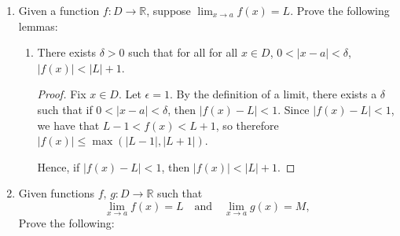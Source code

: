 \documentclass[12pt]{amsart}
\begin{document}
\begin{enumerate}
\begin{proof}
Case 2: $x > 0$. Let $\delta = \epsilon\cdot\sqrt x$. Then if $|x-y| < \delta$,
%
\[ | \sqrt x - \sqrt y | = | \sqrt x - \sqrt y | \cdot \frac {\sqrt x + \sqrt y }{ \sqrt x + \sqrt y } = \frac {|x-y|}{ \sqrt x + \sqrt y}, \]
%
and we have that
%
\[ \frac {|x-y|}{ \sqrt x + \sqrt y} \le \frac{|x-y|}{\sqrt x}, \]
%
and
%
\[ \frac{|x-y|}{\sqrt x} < \frac \delta {\sqrt x} = \frac {\epsilon\sqrt x}{\sqrt x} = \epsilon. \]
\end{proof}

\addtocounter{enumi}{1}

%

\item Given a function $f : D \rightarrow \mathbb{R}$, suppose $\displaystyle \lim_{x\rightarrow a} f(x) = L$.  Prove the following lemmas:

\begin{enumerate}
\item There exists $\delta >0$ such that for all for all $x\in D$, $0<|x-a|<\delta$, $|f(x)|<|L|+1$.   

\begin{proof}
Fix $x \in D$. Let $\epsilon=1$. By the definition of a limit, there exists a $\delta$ such that if $0 < | x - a | < \delta$, then $| f(x) - L| < 1$. Since $| f(x) - L | < 1$, we have that $L - 1 < f(x) < L+1$, so therefore $| f(x)| \le \max( |L-1|, |L+1|)$.

Hence, if $| f(x)-L| < 1$, then $| f(x) | < |L| +1$.
\end{proof}

%

\end{enumerate}

\item Given functions $f,\, g : D \rightarrow \mathbb{R}$ such that
%
\[ \lim_{x\rightarrow a} f(x) = L  \quad \text{and} \quad \lim_{x\rightarrow a} g(x) = M, \]
%
Prove the following:


\end{enumerate}
\end{document}
